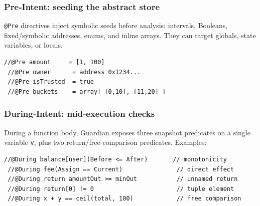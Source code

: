 \documentclass[10pt, conference]{IEEEtran}
\begin{document}
\subsubsection{Pre‑Intent: seeding the abstract store}
%
\texttt{@Pre} directives inject symbolic seeds before analysis:
intervals, Booleans, fixed/symbolic addresses, enums, and inline
arrays.  They can target globals, state variables, or locals.

\begin{lstlisting}[language=Solidity,basicstyle=\scriptsize\ttfamily]
 //@Pre amount     = [1, 100]
 //@Pre owner      = address 0x1234...
 //@Pre isTrusted  = true
 //@Pre buckets    = array[ [0,10], [11,20] ]
\end{lstlisting}

\subsubsection{During‑Intent: mid‑execution checks}
%
During a function body, Guardian exposes three snapshot predicates
on a single variable \verb|v|, plus two return/free-comparison
predicates.  Examples:

\begin{lstlisting}[language=Solidity,basicstyle=\scriptsize\ttfamily]
 //@During balance[user](Before <= After)       // monotonicity
 //@During fee(Assign == Current)               // direct effect
 //@During return amountOut >= minOut           // unnamed return
 //@During return[0] != 0                       // tuple element
 //@During x + y == ceil(total, 100)            // free comparison
\end{lstlisting}
\end{document}
